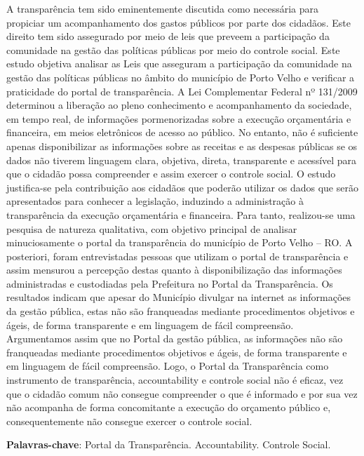 \documentclass[article,12pt,onesidea,4paper,english,brazil]{abntex2}
\begin{document}
	\noindent A transparência tem sido eminentemente discutida como necessária para propiciar um acompanhamento dos gastos públicos por parte dos cidadãos. Este direito tem sido assegurado por meio de leis que preveem a participação da comunidade na gestão das políticas públicas por meio do controle social. Este estudo objetiva analisar as Leis que asseguram a participação da comunidade na gestão das políticas públicas no âmbito do município de Porto Velho e verificar a praticidade do portal de transparência. A Lei Complementar Federal nº 131/2009 determinou a liberação ao pleno conhecimento e acompanhamento da sociedade, em tempo real, de informações pormenorizadas sobre a execução orçamentária e financeira, em meios eletrônicos de acesso ao público. No entanto, não é suficiente apenas disponibilizar as informações sobre as receitas e as despesas públicas se os dados não tiverem linguagem clara, objetiva, direta, transparente e acessível para que o cidadão possa compreender e assim exercer o controle social. O estudo justifica-se pela contribuição aos cidadãos que poderão utilizar os dados que serão apresentados para conhecer a legislação, induzindo a administração à transparência da execução orçamentária e financeira. Para tanto, realizou-se uma pesquisa de natureza qualitativa, com objetivo principal de analisar minuciosamente o portal da transparência do município de Porto Velho – RO. A posteriori, foram entrevistadas pessoas que utilizam o portal de transparência e assim mensurou a percepção destas quanto à disponibilização das informações administradas e custodiadas pela Prefeitura no Portal da Transparência. Os resultados indicam que apesar do Município divulgar na internet as informações da gestão pública, estas não são franqueadas mediante procedimentos objetivos e ágeis, de forma transparente e em linguagem de fácil compreensão. Argumentamos assim que no Portal da gestão pública, as informações não são franqueadas mediante procedimentos objetivos e ágeis, de forma transparente e em linguagem de fácil compreensão. Logo, o Portal da Transparência como instrumento de transparência, accountability e controle social não é eficaz, vez que o cidadão comum não consegue compreender o que é informado e por sua vez não acompanha de forma concomitante a execução do orçamento público e, consequentemente não consegue exercer o controle social.
	
	\vspace{\onelineskip}
	
	\noindent
	\textbf{Palavras-chave}: Portal da Transparência. Accountability. Controle Social.
	
\end{document}
